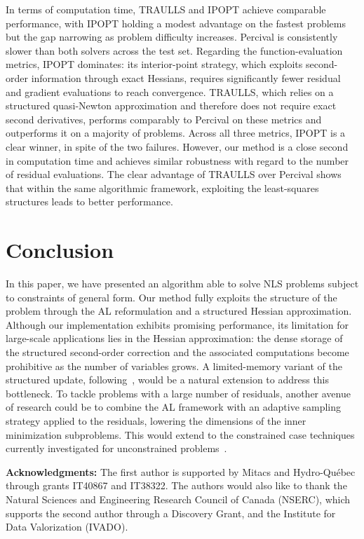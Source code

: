 \documentclass{article}
\numberwithin{equation}{section}
\theoremstyle{plain}
\begin{document}
	In terms of computation time, TRAULLS and IPOPT achieve comparable performance, with
	IPOPT holding a modest advantage on the fastest problems but the gap narrowing as
	problem difficulty increases. Percival is consistently slower than both solvers across the
	test set. Regarding the function-evaluation metrics, IPOPT dominates: its interior-point
	strategy, which exploits second-order information through exact Hessians, requires
	significantly fewer residual and gradient evaluations to reach convergence. TRAULLS, which
	relies on a structured quasi-Newton approximation and therefore does not require exact
	second derivatives, performs comparably to Percival on these metrics and outperforms it on
	a majority of problems.
	Across all three metrics, IPOPT is a clear winner, in spite of the two failures. However, our method is a close second in computation time and achieves similar robustness with regard to the number of residual evaluations. The clear advantage of TRAULLS over Percival shows that within the same algorithmic framework, exploiting the least-squares structures leads to better performance.
	
	\section*{Conclusion}
	In this paper, we have presented an algorithm able to solve NLS problems subject to constraints of general form. Our method fully exploits the structure of the problem through the AL reformulation and a structured Hessian approximation. 
	Although our implementation exhibits promising performance, its limitation for large-scale applications lies in the Hessian approximation: the dense storage of the structured second-order correction and the associated computations become prohibitive as the number of variables grows. A limited-memory variant of the structured update, following~\cite{byrd-etal:1994}, would be a natural extension to address this bottleneck. To tackle problems with a large number of residuals, another avenue of research could be to combine the AL framework with an adaptive sampling strategy applied to the residuals, lowering the dimensions of the inner minimization subproblems. This would extend to the constrained case techniques currently investigated for unconstrained problems~\cite{bellavia-etal:2026}.
	
	\vspace{1em}\noindent\textbf{Acknowledgments:} The first author is supported by Mitacs and  Hydro-Qu\'ebec through grants IT40867 and IT38322. The authors would also like to thank the Natural Sciences and Engineering Research Council of Canada (NSERC), which supports the second author through a Discovery Grant, and the Institute for Data Valorization (IVADO).
				
\end{document}
